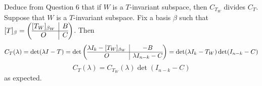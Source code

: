 \documentclass{eh-homework}
\begin{document}
    \begin{question}{7}
    Deduce from Question 6 that if $W$ is a $T$-invariant subspace, then $C_{T_W}$ divides $C_T$.
    \tcblower
    Suppose that \(W\) is a \(T\)-invariant subspace. Fix a basis \(\beta\) such that \([T]_\beta = \left( \begin{array}{@{}c|c@{}}
        [T_W]_{\beta_W} & B \\
        \hline
        O & C \\
    \end{array}\right)\). Then
    \[
        C_T(\lambda) = \det (\lambda I - T) = \det \left( \begin{array}{@{}c|c@{}}
            \lambda I_k - [T_W]_{\beta_W} & -B \\
            \hline
            O & \lambda I_{n-k} - C \\
        \end{array}\right) = \det (\lambda I_k - T_W)\det (I_{n-k} - C)
    \]
    \[
        C_T(\lambda) = C_{T_W}(\lambda)\det (I_{n-k} - C)
    \]
    as expected.
    \end{question}
    \newpage
\end{document}
